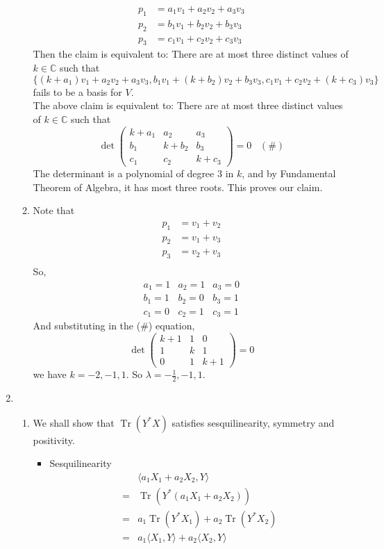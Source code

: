 \documentclass[12pt]{article}
\DeclareMathOperator{\Tr}{Tr}
\theoremstyle{definition}
\begin{document}
\begin{enumerate}
\begin{enumerate}
  \begin{align*}
  p_1 &= a_1v_1 + a_2v_2 + a_3v_3\\
  p_2 &= b_1v_1 + b_2v_2 + b_3v_3\\
  p_3 &= c_1v_1 + c_2v_2 + c_3v_3
  \end{align*}
  Then the claim is equivalent to: There are at most three distinct values of $k\in\mathbb{C}$ such that $\{(k+a_1)v_1+a_2v_2+a_3v_3,b_1v_1+(k+b_2)v_2+b_3v_3,c_1v_1+c_2v_2+(k+c_3)v_3\}$ fails to be a basis for $V$.\\
  The above claim is equivalent to: There are at most three distinct values of $k\in\mathbb{C}$ such that
  \[
  \det\left(\begin{matrix}k+a_1&a_2&a_3 \\ b_1&k+b_2&b_3 \\ c_1&c_2&k+c_3\end{matrix}\right) = 0\;\;\;(\#)
  \]
  The determinant is a polynomial of degree $3$ in $k$, and by Fundamental Theorem of Algebra, it has most three roots. This proves our claim.
  \item Note that 
  \begin{align*}
  p_1&=v_1+v_2\\
  p_2&=v_1+v_3\\
  p_3&=v_2+v_3\\
  \end{align*}
  So,\[
  \begin{array}{ccc}
  a_1=1&a_2 = 1&a_3=0\\
  b_1=1&b_2=0&b_3=1\\
  c_1=0&c_2=1&c_3=1
\end{array}
  \]
  And substituting in the (\#) equation,
  \[
\det\left(\begin{matrix}k+1&1&0 \\ 1&k&1 \\ 0&1&k+1\end{matrix}\right)=0
  \]
  we have $k=-2,-1,1$. So $\lambda = -\frac{1}{2},-1,1$.
  \end{enumerate}
  \item\begin{enumerate}\item
  We shall show that $\Tr(Y^\ast X)$ satisfies sesquilinearity, symmetry and positivity.\\
  \begin{itemize} 
    \item Sesquilinearity \hfill
    \begin{align*}
&\langle a_1X_1+a_2X_2,Y\rangle\\ =&\Tr(Y^\ast (a_1X_1+a_2X_2))\\=&a_1\Tr(Y^\ast X_1)+a_2\Tr(Y^\ast X_2)\\=&a_1\langle X_1,Y\rangle + a_2\langle X_2,Y\rangle

\end{align*}
\end{itemize}
\end{enumerate}
\end{enumerate}
\end{document}
